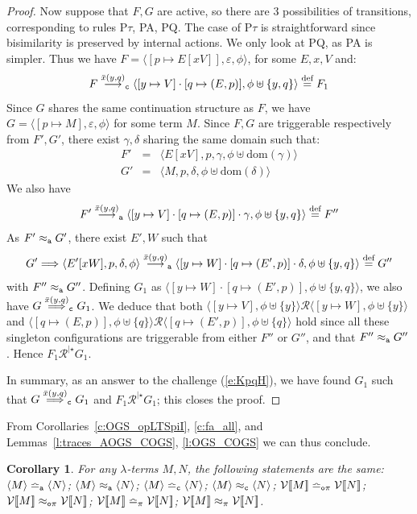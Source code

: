 \documentclass[11pt,a4paper]{amsart}
\theoremstyle{plain}
\theoremstyle{definition}
\theoremstyle{defC}
\theoremstyle{thmC}
\theoremstyle{plain}
\numberwithin{equation}{section}
\newcommand{\uptoComp}[1]{\mathrel{#1^{|\star}}}
\newcommand{\Ep}{E'}              %
\newcommand{\rmm}[1]{{\tt{\lowercase{#1}}}}
\newcommand{\genarr}[2]{\mathrel{\stackrel{{#1}}{\longrightarrow}_{\rmm{\lowercase{#2}}}}}
\newcommand{\genArr}[2]{\mathrel{\stackrel{{#1}}{\Longrightarrow}_{\rmm{\lowercase{#2}}}}}  %
\newcommand{\arrA}[1]{\genarr{#1}{A}}  %
\newcommand{\arrC}[1]{\genarr{#1}{C}}   %
\newcommand{\ArrC}[1]{\genArr{#1}{C}}   %
\newcommand{\genTE}[1]{\mathrel{\bumpeq_{\rmm{\lowercase{#1}}}}}       %
\newcommand{\genwb}[1]{\mathrel{\approx_{\rmm{\lowercase{#1}}}}}       %
\newcommand{\wbPI}{\genwb{\pi}}       %
\newcommand{\wbOPI}{\genwb{o\pi}}       %
\newcommand{\wbC}{\genwb{C}}       %
\newcommand{\wbA}{\genwb{A}}       %
\newcommand{\TEPI}{\genTE{\pi}}       %
\newcommand{\TEN}{\genTE{o\pi}}     %
\newcommand{\TEA}{\genTE{A}}       %
\newcommand{\TEp}{\genTE{C}}       %
\def\R{{\mathcal R}}
\def\RR{\mathrel{\mathcal R}}
\def\defi{\stackrel{\mbox{\scriptsize {\rm{def}}}}{=}} %
\newcommand{\FF}{F}
\newcommand{\GG}{G}
\newcommand{\cbvSymb}{{\mathcal {V}}}
\newcommand{\encoEnvI}[1]{ \cbvSymb[\! [ #1 ] \! ]  } %
\newcommand{\reff}[1]{(\ref{#1})}
\newcommand{\dom}[1]{\mathrm{dom}(#1)}
\newcommand{\emptymap}{\varepsilon}
\newcommand{\pmap}[2]{[#1 \mapsto #2]}
\newcommand{\questPV}[3]{\bar{#1}(#2,#3)}
\newcommand{\conf}[1]{\langle #1\rangle}
\theoremstyle{plain}
\newtheorem{corollary}[thm]{Corollary}
\theoremstyle{definition}
\begin{document}
\begin{proof}
  \noindent
  Now suppose that $\FF,\GG$ are active,
  so there are 3 possibilities of transitions, corresponding to rules 
  P$\tau$, PA, PQ. The case of 
  P$\tau$ is straightforward since bisimilarity is preserved by internal
  actions.  We only look at PQ, as PA is simpler. 
  Thus we have 
  $\FF = \conf{\pmap{p}{E[x V]},\emptymap,\phi}$, for some $E,x,V$ and: 
  \begin{equation}
  \label{e:KpqH}
   \FF  \arrC{\questPV{x}{y}{q}} 
        \conf{\pmap{y}{V} \cdot \pmap{q}{(E,p)}, \phi \uplus \{y,q\}} 
        \defi \FF_1
  \end{equation} 
  Since $\GG$ shares the same continuation structure as $\FF$,
  we have $\GG = \conf{\pmap{p}{M},\emptymap,\phi}$ for some term $M$.
  Since $\FF,\GG$ are triggerable respectively from $\FF',\GG'$,
  there exist $\gamma,\delta$ sharing the same domain such that:  
  \[\begin{array}{rcl}
    \FF' & = & \conf{E[x V], p, \gamma, \phi\uplus\dom{\gamma}} \\ 
    \GG' & = & \conf{M, p, \delta, \phi\uplus\dom{\delta}} 
  \end{array}\]
  We also have 
  \[
  \FF' \arrA{\questPV{x}{y}{q}} 
   \conf{ \pmap{y}{V} \cdot \pmap{q}{(E,p)} \cdot \gamma, \phi  \uplus \{y,q\}}
   \defi \FF''
  \]
  As $\FF' \wbA \GG'$, there exist $\Ep,W$ such that 
  \[
  \GG'  \Longrightarrow 
   \conf{\Ep[x W],p,\delta,\phi}
  \arrA{\questPV{x}{y}{q}} 
  \conf{\pmap{y}{W} \cdot \pmap{q}{(\Ep,p)} \cdot \delta, \phi \uplus \{y,q\}} 
  \defi \GG''
  \]
  with
  $\FF'' \wbA \GG''$. 
  Defining $\GG_1$ as
  $\conf{\pmap{y}{W} \cdot \pmap{q}{(\Ep,p)}, \phi \uplus \{y,q\}}$,
  we also have $\GG \ArrC{\questPV{x}{y}{q}} \GG_1$. 
  We deduce that both 
  $\conf{ \pmap{y}{V},\phi \uplus \{y\}} 
   \RR
   \conf{ \pmap{y}{W},\phi \uplus\{y\}}$ 
  and 
  $\conf{ \pmap{q}{(E,p)},\phi \uplus \{q\}}
   \RR
   \conf{ \pmap{q}{(\Ep,p)},\phi \uplus \{q\}}$ hold
   since all these singleton configurations
   are triggerable from either $\FF''$ or $\GG''$,
   and that $\FF'' \wbA \GG''$.
  Hence $\FF_1 \uptoComp \R  \GG_1$.
  
  In summary, as an answer to the challenge 
  \reff{e:KpqH}, we have found  $\GG_1$ such that 
   $\GG \ArrC{\questPV{x}{y}{q}}
   \GG_1$ and  
  $\FF_1 \uptoComp \R  \GG_1$; this closes the proof.
\end{proof} 

\noindent
From Corollaries~\ref{c:OGS_opLTSpiI}, \ref{c:fa_all}, and 
Lemmas~\ref{l:traces_AOGS_COGS}, \ref{l:OGS_COGS} we can thus conclude. 
\begin{corollary}
\label{c:OGS_COGS}
For any $\lambda$-terms $M,N$, the following statements are the same: 
$\conf{M} \TEA \conf {N}$;
$\conf{M} \wbA \conf {N}$;
$\conf{M} \TEp \conf {N}$;
$\conf{M} \wbC \conf {N}$;
$\encoEnvI {{M} } \TEN\encoEnvI {{N}}$; 
$\encoEnvI {{M}} \wbOPI \encoEnvI {{N}}$; 
$\encoEnvI {{M} } \TEPI\encoEnvI {{N}}$; 
$\encoEnvI {{M}} \wbPI \encoEnvI {{N}}$. 
\end{corollary} 
\end{document}
